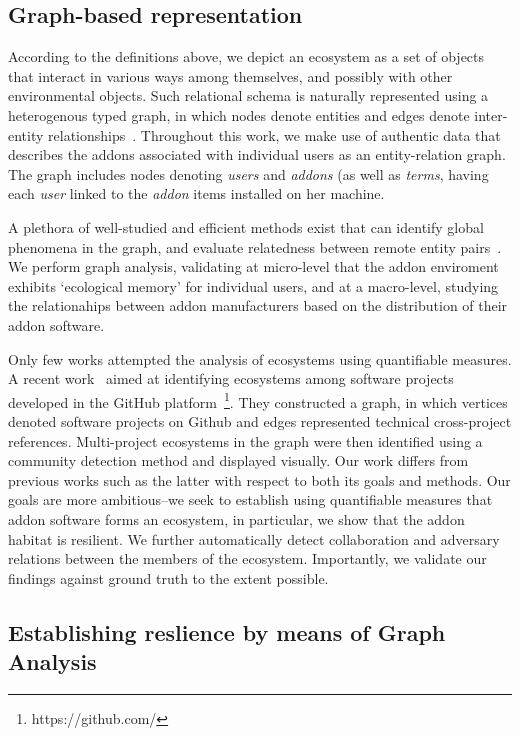 \documentclass[ijoc,nonblindrev]{informs3} %
\numberwithin{equation}{subsection}
\begin{document}
\subsection{Graph-based representation}
\label{sec:pagerank_related}

According to the definitions above, we depict an ecosystem as a set of objects that interact in various ways among themselves, and possibly with other environmental objects. Such relational schema is naturally represented using a heterogenous typed graph, in which nodes denote entities and edges denote  inter-entity relationships~\citep{minkov2010improving,sunWSDM12}. Throughout this work, we make use of authentic data that describes the addons associated with individual users as an entity-relation graph. The graph includes nodes denoting {\it users} and {\it addons} (as well as {\it terms}, having each {\it user} linked to the {\it addon} items installed on her machine.

A plethora of well-studied and efficient methods exist that can identify global phenomena in the graph, and evaluate relatedness between remote entity pairs~\citep{kleinberg07,sun12}. We perform graph analysis, validating at micro-level that the addon enviroment exhibits `ecological memory' for individual users, and at a macro-level, studying the relationahips between addon manufacturers based on the distribution of their addon software.  

Only few works attempted the analysis of ecosystems using quantifiable measures. A recent work~\citep{blincoeMSR15} aimed at identifying ecosystems among software projects developed in the GitHub platform~\footnote{https://github.com/}. They constructed a graph, in which vertices denoted software projects on Github and edges represented technical cross-project references. Multi-project ecosystems in the graph were then identified using a community detection method and displayed visually. Our work differs from previous works such as the latter with respect to both its goals and methods. Our goals are more ambitious--we seek to establish using quantifiable measures that addon software forms an ecosystem, in particular, we show that the addon habitat is resilient. We further automatically detect collaboration and adversary relations between the members of the ecosystem. Importantly, we validate our findings against ground truth to the extent possible.

\subsection{Establishing reslience by means of Graph Analysis}
\label{sec:link_prediction}
\end{document}
